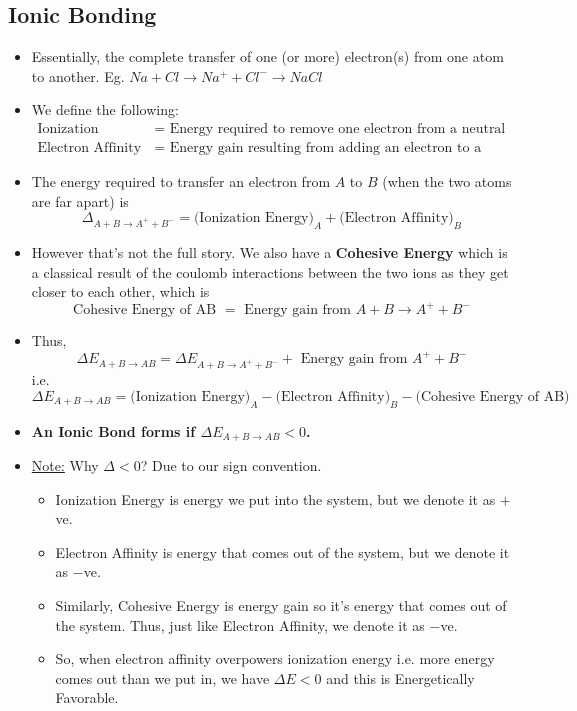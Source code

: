 \documentclass[11pt]{article}
\begin{document}
\subsection{Ionic Bonding}
\begin{itemize}
  \item Essentially, the complete transfer of one (or more) electron(s) from one atom to another. Eg. $Na + Cl \rightarrow Na^{+} + Cl^{-} \rightarrow NaCl$
  \item We define the following: 
  \begin{align*}
    \text{Ionization Energy } &= \text{ Energy required to remove one electron from a neutral atom} \\
    \text{Electron Affinity } &= \text{ Energy gain resulting from adding an electron to a neutral atom} 
  \end{align*}
  \item The energy required to transfer an electron from $A$ to $B$ (when the two atoms are far apart) is $$\Delta_{A + B \rightarrow A^+ + B^{-}} = \text{(Ionization Energy)}_{A} + \text{(Electron Affinity)}_B $$
  \item However that's not the full story. We also have a \textbf{Cohesive Energy} which is a classical result of the coulomb interactions between the two ions as they get closer to each other, which is $$ \text{Cohesive Energy of AB } = \text{ Energy gain from } A+B \rightarrow A^+ + B^- $$
  \item Thus, $$ \Delta E_{A + B \rightarrow AB} = \Delta E_{A + B \rightarrow A^+ + B^-} + \text{ Energy gain from } A^+ + B^- $$ i.e. $$ \boxed{\Delta E_{A+B \rightarrow AB} = \text{(Ionization Energy)}_A - \text{(Electron Affinity)}_{B} - \text{(Cohesive Energy of AB)} }$$
  \item \textbf{An Ionic Bond forms if $\Delta E_{A+B \rightarrow AB} < 0$. }
  \item \underline{Note:} Why $\Delta < 0$? Due to our sign convention.
  \begin{itemize}
    \item Ionization Energy is energy we put into the system, but we denote it as $+$ve.
    \item Electron Affinity is energy that comes out of the system, but we denote it as $-$ve.
    \item Similarly, Cohesive Energy is energy gain so it's energy that comes out of the system. Thus, just like Electron Affinity, we denote it as $-$ve.
    \item So, when electron affinity overpowers ionization energy i.e. more energy comes out than we put in, we have $\Delta E < 0$ and this is Energetically Favorable.
  \end{itemize}
\end{itemize}
\end{document}
